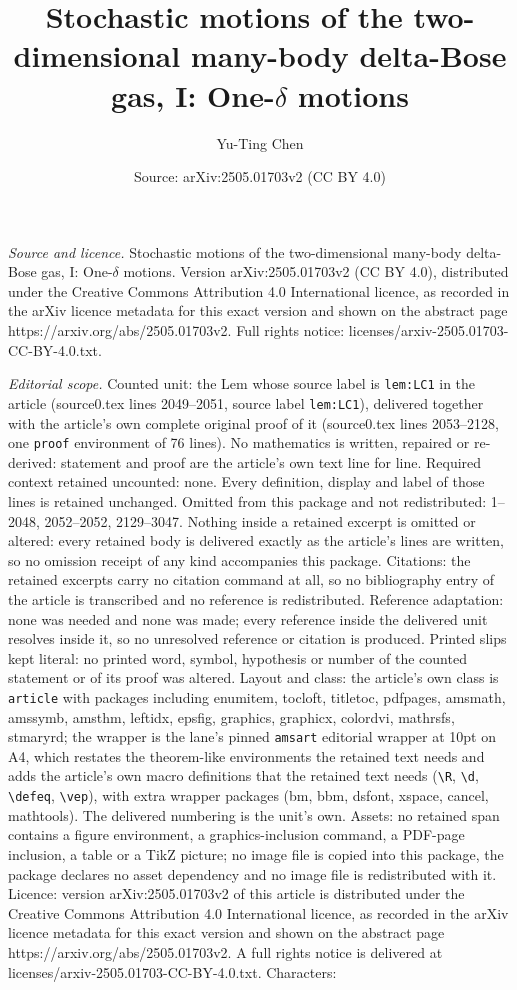 \documentclass[10pt,a4paper]{amsart}
\title[Stochastic motions of the two-dimensional many-body delta-Bo]{Stochastic motions of the two-dimensional many-body delta-Bose gas, I: One-$\delta$ motions}
\author{Yu-Ting Chen}
\date{Source: arXiv:2505.01703v2 (CC BY 4.0)}
\begin{document}
\maketitle

\noindent\emph{Source and licence.} Stochastic motions of the two-dimensional many-body delta-Bose gas, I: One-$\delta$ motions. Version arXiv:2505.01703v2 (CC BY 4.0), distributed under the Creative Commons Attribution 4.0 International licence, as recorded in the arXiv licence metadata for this exact version and shown on the abstract page https://arxiv.org/abs/2505.01703v2. Full rights notice: licenses/arxiv-2505.01703-CC-BY-4.0.txt.\par\smallskip

\noindent\textit{Editorial scope.} Counted unit: the Lem whose source label is \texttt{lem:LC1} in the article (source0.tex lines 2049--2051, source label \texttt{lem:LC1}), delivered together with the article's own complete original proof of it (source0.tex lines 2053--2128, one \texttt{proof} environment of 76 lines). No mathematics is written, repaired or re-derived: statement and proof are the article's own text line for line. Required context retained uncounted: none. Every definition, display and label of those lines is retained unchanged. Omitted from this package and not redistributed: 1--2048, 2052--2052, 2129--3047. Nothing inside a retained excerpt is omitted or altered: every retained body is delivered exactly as the article's lines are written, so no omission receipt of any kind accompanies this package. Citations: the retained excerpts carry no citation command at all, so no bibliography entry of the article is transcribed and no reference is redistributed. Reference adaptation: none was needed and none was made; every reference inside the delivered unit resolves inside it, so no unresolved reference or citation is produced. Printed slips kept literal: no printed word, symbol, hypothesis or number of the counted statement or of its proof was altered. Layout and class: the article's own class is \texttt{article} with packages including enumitem, tocloft, titletoc, pdfpages, amsmath, amssymb, amsthm, leftidx, epsfig, graphics, graphicx, colordvi, mathrsfs, stmaryrd; the wrapper is the lane's pinned \texttt{amsart} editorial wrapper at 10pt on A4, which restates the theorem-like environments the retained text needs and adds the article's own macro definitions that the retained text needs (\texttt{\textbackslash R}, \texttt{\textbackslash d}, \texttt{\textbackslash defeq}, \texttt{\textbackslash vep}), with extra wrapper packages (bm, bbm, dsfont, xspace, cancel, mathtools). The delivered numbering is the unit's own. Assets: no retained span contains a figure environment, a graphics-inclusion command, a PDF-page inclusion, a table or a TikZ picture; no image file is copied into this package, the package declares no asset dependency and no image file is redistributed with it. Licence: version arXiv:2505.01703v2 of this article is distributed under the Creative Commons Attribution 4.0 International licence, as recorded in the arXiv licence metadata for this exact version and shown on the abstract page https://arxiv.org/abs/2505.01703v2. A full rights notice is delivered at licenses/arxiv-2505.01703-CC-BY-4.0.txt. Characters: 
\end{document}
